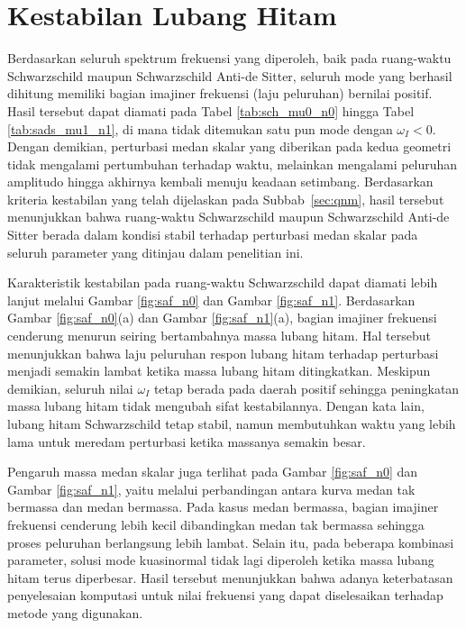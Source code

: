 \section{Kestabilan Lubang Hitam}
\label{sec:stabil}

Berdasarkan seluruh spektrum frekuensi yang diperoleh, baik pada ruang-waktu Schwarzschild maupun Schwarzschild Anti-de Sitter, seluruh mode yang berhasil dihitung memiliki bagian imajiner frekuensi (laju peluruhan) bernilai positif. Hasil tersebut dapat diamati pada Tabel \ref{tab:sch_mu0_n0} hingga Tabel \ref{tab:sads_mu1_n1}, di mana tidak ditemukan satu pun mode dengan $\omega_I<0$. Dengan demikian, perturbasi medan skalar yang diberikan pada kedua geometri tidak mengalami pertumbuhan terhadap waktu, melainkan mengalami peluruhan amplitudo hingga akhirnya kembali menuju keadaan setimbang. Berdasarkan kriteria kestabilan yang telah dijelaskan pada Subbab~\ref{sec:qnm}, hasil tersebut menunjukkan bahwa ruang-waktu Schwarzschild maupun Schwarzschild Anti-de Sitter berada dalam kondisi stabil terhadap perturbasi medan skalar pada seluruh parameter yang ditinjau dalam penelitian ini.

Karakteristik kestabilan pada ruang-waktu Schwarzschild dapat diamati lebih lanjut melalui Gambar \ref{fig:saf_n0} dan Gambar \ref{fig:saf_n1}. Berdasarkan Gambar \ref{fig:saf_n0}(a) dan Gambar \ref{fig:saf_n1}(a), bagian imajiner frekuensi cenderung menurun seiring bertambahnya massa lubang hitam. Hal tersebut menunjukkan bahwa laju peluruhan respon lubang hitam terhadap perturbasi menjadi semakin lambat ketika massa lubang hitam ditingkatkan. Meskipun demikian, seluruh nilai $\omega_I$ tetap berada pada daerah positif sehingga peningkatan massa lubang hitam tidak mengubah sifat kestabilannya. Dengan kata lain, lubang hitam Schwarzschild tetap stabil, namun membutuhkan waktu yang lebih lama untuk meredam perturbasi ketika massanya semakin besar.

Pengaruh massa medan skalar juga terlihat pada Gambar \ref{fig:saf_n0} dan Gambar \ref{fig:saf_n1}, yaitu melalui perbandingan antara kurva medan tak bermassa dan medan bermassa. Pada kasus medan bermassa, bagian imajiner frekuensi cenderung lebih kecil dibandingkan medan tak bermassa sehingga proses peluruhan berlangsung lebih lambat. Selain itu, pada beberapa kombinasi parameter, solusi mode kuasinormal tidak lagi diperoleh ketika massa lubang hitam terus diperbesar. Hasil tersebut menunjukkan bahwa adanya keterbatasan penyelesaian komputasi untuk nilai frekuensi yang dapat diselesaikan terhadap metode yang digunakan.

